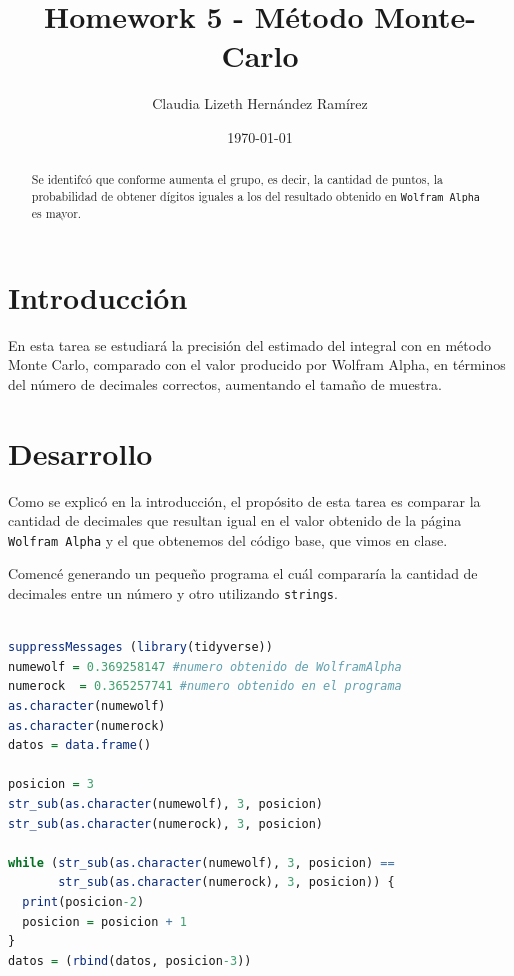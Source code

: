 \documentclass{article}
\author{Claudia Lizeth Hern\'andez Ram\'irez} %
\title{Homework 5 - M\'etodo Monte-Carlo} %
\date{\today}
\begin{document}

\maketitle %

\begin{abstract} %
  \centering
Se identifc\'o que conforme aumenta el grupo, es decir, la cantidad de puntos, la probabilidad de obtener dígitos iguales a los del resultado obtenido en \texttt{Wolfram Alpha} es mayor.
  
\end{abstract}


\section{Introducci\'{o}n}\label{intro} %

En esta tarea se estudiar\'a la precisi\'on del estimado del integral con en m\'etodo Monte Carlo, comparado con el valor producido por Wolfram Alpha, en t\'erminos del n\'umero de decimales correctos, aumentando el tamaño de muestra.


\section{Desarrollo}\label{desarrollo} %
Como se explic\'o en la introducci\'on, el prop\'osito de esta tarea es comparar la cantidad de decimales que resultan igual en el valor obtenido de la p\'agina \texttt{Wolfram Alpha} y el que obtenemos del c\'odigo base, que vimos en clase\cite{Cbase}.

Comenc\'e generando un pequeño programa el cu\'al comparar\'ia la cantidad de decimales entre un n\'umero y otro utilizando \texttt{strings}.
\begin{lstlisting}[language=R, caption= C\'odigo para comparar n\'umeros como strings.]

suppressMessages (library(tidyverse))
numewolf = 0.369258147 #numero obtenido de WolframAlpha
numerock  = 0.365257741 #numero obtenido en el programa
as.character(numewolf)
as.character(numerock)
datos = data.frame()

posicion = 3
str_sub(as.character(numewolf), 3, posicion)
str_sub(as.character(numerock), 3, posicion)

while (str_sub(as.character(numewolf), 3, posicion) == 
       str_sub(as.character(numerock), 3, posicion)) {
  print(posicion-2)
  posicion = posicion + 1
}
datos = (rbind(datos, posicion-3))
\end{lstlisting}
\end{document}
